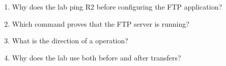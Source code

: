 \begin{quickcheck}
\begin{enumerate}
\item Why does the lab ping R2 before configuring the FTP application?
\item Which command proves that the FTP server is running?
\item What is the direction of a  operation?
\item Why does the lab use  both before and after transfers?
\end{enumerate}
\end{quickcheck}
